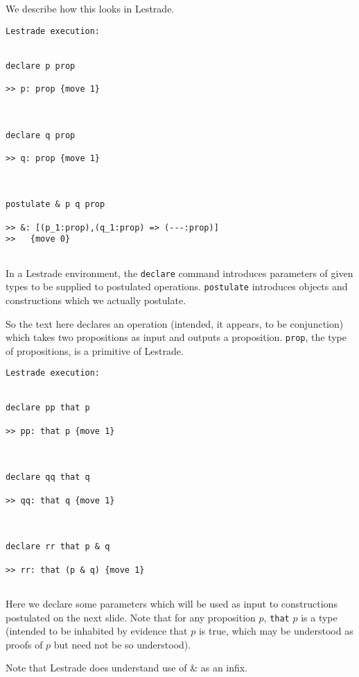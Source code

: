 \documentclass{slides}
\begin{document}
\begin{slide}

We describe how this looks in Lestrade.

\begin{verbatim}Lestrade execution:


declare p prop

>> p: prop {move 1}



declare q prop

>> q: prop {move 1}



postulate & p q prop

>> &: [(p_1:prop),(q_1:prop) => (---:prop)]
>>   {move 0}


\end{verbatim}

\end{slide}

\begin{slide}

In a Lestrade environment, the {\tt declare} command introduces parameters of given types to be supplied to postulated operations.  {\tt postulate} introduces objects and constructions which we actually postulate.

So the text here declares an operation (intended, it appears, to be conjunction) which takes two propositions as input and outputs a proposition.  {\tt prop}, the type of propositions, is a primitive of Lestrade.

\end{slide}

\begin{slide}

\begin{verbatim}Lestrade execution:


declare pp that p

>> pp: that p {move 1}



declare qq that q

>> qq: that q {move 1}



declare rr that p & q

>> rr: that (p & q) {move 1}


\end{verbatim}

\end{slide}

\begin{slide}

Here we declare some parameters which will be used as input to constructions postulated on the next slide.  Note that for any proposition $p$, {\tt that} $p$ is a type (intended to be inhabited by evidence that $p$ is true, which may be understood as proofs of $p$ but need not be so understood).

Note that Lestrade does understand use of \& as an infix.

\end{slide}
\end{document}

